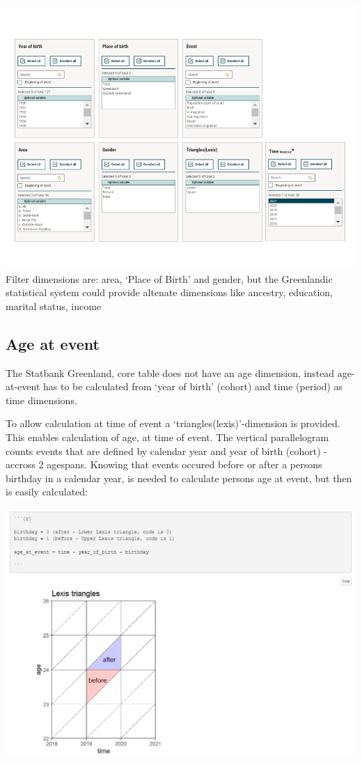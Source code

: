 \documentclass[USenglish]{article}
\begin{document}
\includegraphics[scale=0.4]{images/PopulationAccountCore}
Filter dimensions are: area, ‘Place of Birth’ and gender, but the Greenlandic statistical system could provide altenate dimensions like ancestry, education, marital status, income


\subsection{Age at event} 

The Statbank Greenland, core table does not have an age dimension, instead age-at-event has to be calculated from ‘year of birth’ (cohort) and time (period) as time dimensions.

To allow calculation at time of event a ‘triangles(lexis)’-dimension is provided. This enables calculation of age, at time of event. The vertical parallelogram counts events that are defined by calendar year and year of birth (cohort) - accross 2 agespans. Knowing that events occured before or after a persons birthday in a calendar year, is needed to calculate persons age at event, but then is easily calculated:

\includegraphics[scale=0.25]{images/PopulationAccountLexis}
\end{document}
